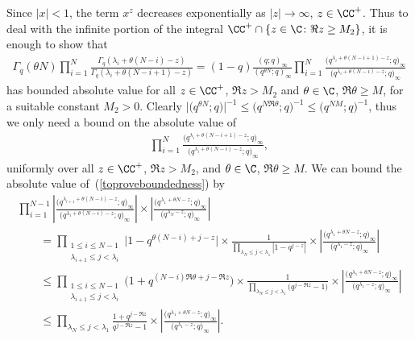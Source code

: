 Since $|x| < 1$, the term $x^z$ decreases exponentially as $|z|\rightarrow\infty$, $z\in\CC^+$. Thus to deal with the inf\/inite portion of the integral $\CC^+\cap\{z\in\C\colon \Re z \geq M_2\}$, it is enough to show that
\begin{gather*}
\Gamma_q(\theta N)\prod_{i=1}^N{\frac{\Gamma_q(\lambda_i + \theta(N - i) - z)}{\Gamma_q(\lambda_i + \theta(N - i + 1) - z)}} = (1 - q)\frac{(q; q)_{\infty}}{(q^{\theta N}; q)_{\infty}}\prod_{i=1}^N{\frac{\big(q^{\lambda_i + \theta(N - i + 1) - z}; q\big)_{\infty}}{\big(q^{\lambda_i + \theta (N - i) - z}; q\big)_{\infty}}}
\end{gather*}
has bounded absolute value for all $z\in\CC^+$, $\Re z > M_2$ and $\theta\in\C$, $\Re\theta \geq M$, for a suitable constant $M_2 > 0$. Clearly $\big|\big(q^{\theta N}; q\big)\big|^{-1} \leq \big(q^{N\Re\theta}; q\big)^{-1} \leq \big(q^{NM}; q\big)^{-1}$, thus we only need a bound on the absolute value of
\begin{gather}\label{toproveboundedness}
\prod_{i=1}^N{\frac{\big(q^{\lambda_i + \theta(N - i + 1) - z}; q\big)_{\infty}}{\big(q^{\lambda_i + \theta (N - i) - z}; q\big)_{\infty}}},
\end{gather}
uniformly over all $z\in\CC^+$, $\Re z > M_2$, and $\theta\in\C$, $\Re\theta \geq M$. We can bound the absolute value of~(\ref{toproveboundedness}) by
\begin{gather*}
\prod_{i=1}^{N-1}{\left|\frac{\big(q^{\lambda_{i+1} + \theta(N - i) - z}; q\big)_{\infty}}{\big(q^{\lambda_i + \theta (N - i) - z}; q\big)_{\infty}}\right|}\times\left|\frac{\big(q^{\lambda_1 + \theta N - z}; q\big)_{\infty}}{\big(q^{\lambda_N - z}; q\big)_{\infty}}\right|\\
\qquad{} = \prod_{ \substack{1\leq i\leq N - 1 \\ \lambda_{i+1} \leq j < \lambda_i} }{\big|1 - q^{\theta(N - i) + j - z}\big|}\times\frac{1}{\prod\limits_{\lambda_N \leq j < \lambda_1}{|1 - q^{j - z}|}}
\times\left|\frac{\big(q^{\lambda_1 + \theta N - z}; q\big)_{\infty}}{\big(q^{\lambda_1 - z}; q\big)_{\infty}}\right|\\
\qquad{} \leq \prod_{ \substack{1\leq i\leq N - 1 \\ \lambda_{i+1} \leq j < \lambda_i} }{\big(1 + q^{(N - i)\Re\theta + j - \Re z}\big)}\times\frac{1}{\prod\limits_{\lambda_N \leq j < \lambda_1}{\big(q^{j-\Re z} - 1\big)}}\times\left|\frac{\big(q^{\lambda_1 + \theta N - z}; q\big)_{\infty}}{\big(q^{\lambda_1 - z}; q\big)_{\infty}}\right|\\
\qquad{} \leq \prod_{\lambda_N \leq j < \lambda_1}{\frac{1 + q^{j - \Re z}}{q^{j - \Re z} - 1}}\times\left|\frac{\big(q^{\lambda_1 + \theta N - z}; q\big)_{\infty}}{\big(q^{\lambda_1 - z}; q\big)_{\infty}}\right|.
\end{gather*}
